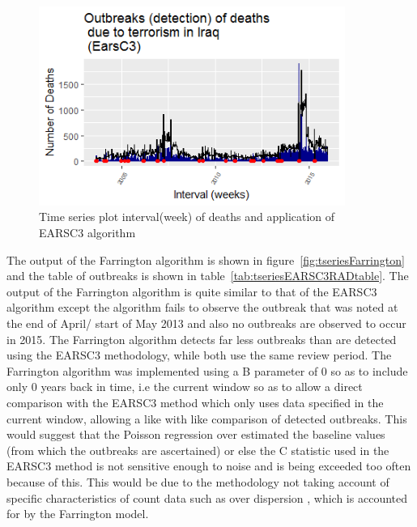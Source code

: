 \begin{figure}[t]
\includegraphics[width=10cm]{Peters_experiment_markdown_files/figure-latex/Rplot02_EarsC3.png}
\caption{Time series plot interval(week) of deaths and application of EARSC3 algorithm}
\label{fig:tseriesEARSC3RAD}
\centering
\end{figure}

The output of the Farrington algorithm is shown in figure~\ref{fig:tseriesFarrington} and the table of outbreaks is shown in table~\ref{tab:tseriesEARSC3RADtable}. The output of the Farrington algorithm is quite similar to that of the EARSC3 algorithm except the algorithm fails to observe the outbreak that was noted at the end of April/ start of May 2013 and also no outbreaks are observed to occur in 2015. The Farrington algorithm detects far less outbreaks than are detected using the EARSC3 methodology, while both use the same review period. The Farrington algorithm was implemented using a B parameter of 0 so as to  include only 0 years back in time, i.e the current window so as to allow a direct comparison with the EARSC3 method which only uses data specified in the current window, allowing a like with like comparison of detected outbreaks. This would suggest that the Poisson regression over estimated the baseline values (from which the outbreaks are ascertained) or else the C statistic used in the EARSC3 method is not sensitive enough to noise and is being exceeded too often because of this. This would be due to the methodology not taking account of specific characteristics of count data such as over dispersion \citep{sellers2013data}, which is accounted for by the Farrington model.

